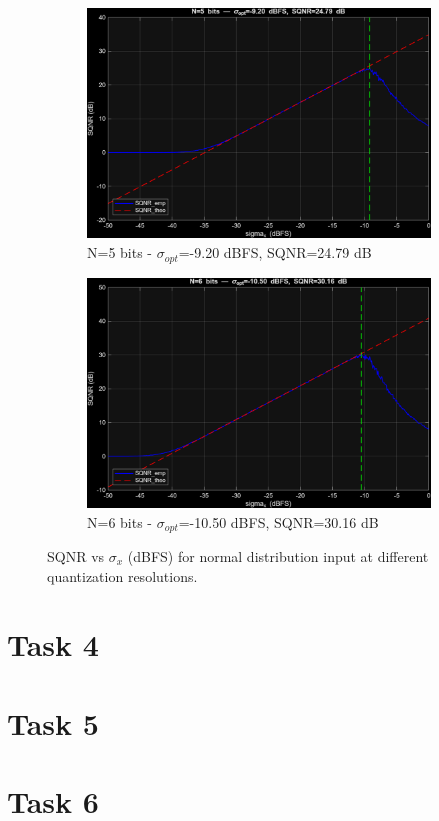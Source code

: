 \documentclass[11pt,a4paper]{article}
\begin{document}
\begin{figure}[H]
  \begin{subfigure}[t]{.4\textwidth}
    \centering
    \includegraphics[width=\linewidth]{img/task3_normal_n5.png}
    \caption{N=5 bits - $\sigma_{opt}$=-9.20 dBFS, SQNR=24.79 dB}
  \end{subfigure}
  \hfill
  \begin{subfigure}[t]{.4\textwidth}
    \centering
    \includegraphics[width=\linewidth]{img/task3_normal_n6.png}
    \caption{N=6 bits - $\sigma_{opt}$=-10.50 dBFS, SQNR=30.16 dB}
  \end{subfigure}

  \caption{SQNR vs $\sigma_x$ (dBFS) for normal distribution input at different quantization resolutions.}
  \label{fig:task3_normal_sqnr_vs_sigma}
\end{figure}

\vspace{0.5cm}
\section{Task 4}


\vspace{0.5cm}
\section{Task 5}


\vspace{0.5cm}
\section{Task 6}



\end{document}
